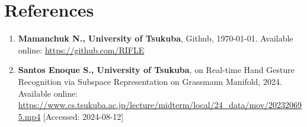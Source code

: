 \documentclass[12pt,a4paper]{article}
\begin{document}


\section*{References}
\begin{enumerate}
    \item \textbf{Mamanchuk N., University of Tsukuba}, Github, \today. Available online: \url{https://github.com/RIFLE}
    \item \textbf{Santos Enoque S., University of Tsukuba}, on Real-time Hand Gesture Recognition via Subspace Representation
    on Grassmann Manifold, 2024. Available online: \url{https://www.cs.tsukuba.ac.jp/lecture/midterm/local/24_data/mov/202320695.mp4} [Accessed: 2024-08-12]
\end{enumerate}

\end{document}
